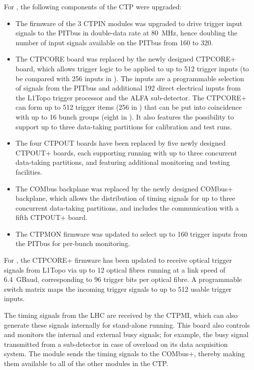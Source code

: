 \documentclass[cernpreprint, atlasdraft=false, UKenglish,british,orcidlogo, texmf, orcidlogo]{atlasdoc}
\begin{document}
For \RunTwo, the following components of the \gls{CTP} were upgraded:
\begin{itemize}
\item The firmware of the 3 \gls{CTPIN} modules was upgraded to drive trigger input signals to the \gls{PITbus} in double-data rate at \SI{80}{\MHz}, hence doubling the number of input signals available on the PITbus from 160 to 320.
\item The CTPCORE board was replaced by the newly designed \gls{CTPCORE+} board, which allows trigger logic to be applied to up to 512 trigger inputs (to be compared with 256 inputs in \RunOne).  The inputs are a programmable selection of signals from the PITbus and additional 192 direct electrical inputs from the \gls{L1Topo} trigger processor and the \gls{ALFA} sub-detector.  The \gls{CTPCORE+} can form up to 512 trigger items (256 in \RunOne) that can be put into coincidence with up to 16 bunch groups (eight in \RunOne).  It also features the possibility to support up to three data-taking partitions for calibration and test runs.  
\item The four CTPOUT boards have been replaced by five newly designed \gls{CTPOUT+} boards, each supporting running with up to three concurrent data-taking partitions, and featuring additional monitoring and testing facilities.
\item The COMbus backplane was replaced by the newly designed \gls{COMbus+} backplane, which allows the distribution of timing signals for up to three concurrent data-taking partitions, and includes the communication with a fifth \gls{CTPOUT+} board.
\item The \gls{CTPMON} firmware was updated to select up to 160 trigger inputs from the \gls{PITbus} for per-bunch monitoring.
\end{itemize}
 
For \RunThr, the \gls{CTPCORE+} firmware has been updated to receive optical trigger signals from \gls{L1Topo} via up to 12 optical fibres running at a link speed of \SI{6.4}{GBaud}, corresponding to 96 trigger bits per optical fibre.  A programmable switch matrix maps the incoming trigger signals to up to 512 usable trigger inputs.
 
The timing signals from the \gls{LHC} are received by the \gls{CTPMI}, which can also generate these signals internally for stand-alone running.  This board also controls and monitors the internal and external busy signals; for example, the busy signal transmitted from a sub-detector in case of overload on its data acquisition system.  The module sends the timing signals to the \gls{COMbus+}, thereby making them available to all of the other modules in the \gls{CTP}.
 
\end{document}
